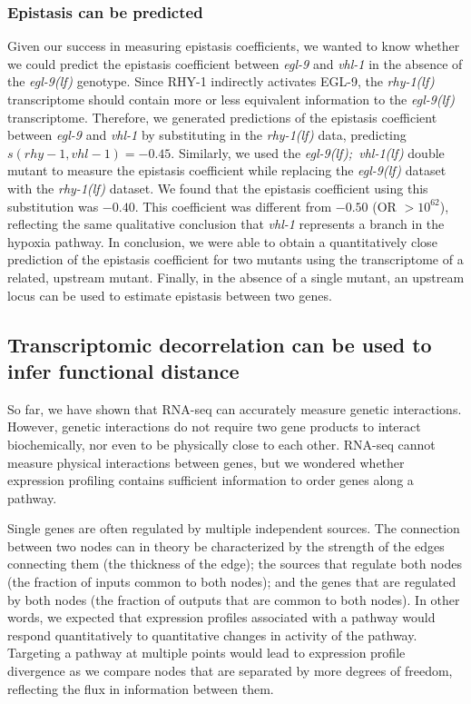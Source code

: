 \documentclass[9pt,twocolumn,twoside]{pnas-new}
\newcommand{\gene}[1]{\mbox{\emph{#1}}}
\newcommand{\egl}{\gene{egl-9(lf)}}
\newcommand{\rhy}{\gene{rhy-1(lf)}}
\newcommand{\eglvhl}{\gene{egl-9(lf); vhl-1(lf)}}
\newcommand{\eglp}{EGL-9}
\newcommand{\rhyp}{RHY-1}
\begin{document}
\subsubsection*{Epistasis can be predicted}
Given our success in measuring epistasis coefficients, we wanted to know whether
we could predict the epistasis coefficient between \gene{egl-9} and \gene{vhl-1}
in the absence of the \egl{} genotype. Since \rhyp{} indirectly activates
\eglp{}, the \rhy{} transcriptome should contain more or less equivalent
information to the \egl{} transcriptome. Therefore, we generated predictions of
the epistasis coefficient between \gene{egl-9} and \gene{vhl-1} by substituting
in the \rhy{} data, predicting $s({rhy-1,vhl-1}) = -0.45$. Similarly, we used
the \eglvhl{} double mutant to measure the epistasis coefficient while replacing
the \egl{} dataset with the \rhy{} dataset. We found that the epistasis
coefficient using this substitution was $-0.40$. This coefficient was different
from $-0.50$ (OR $>10^{62}$), reflecting the same qualitative conclusion that
\gene{vhl-1} represents a branch in the hypoxia pathway. In conclusion, we were
able to obtain a quantitatively close prediction of the epistasis coefficient
for two mutants using the transcriptome of a related, upstream mutant. Finally,
in the absence of a single mutant, an upstream locus can be used to estimate
epistasis between two genes.

\subsection*{Transcriptomic decorrelation can be used to infer functional distance}
\label{sub:decorrelation}
So far, we have shown that RNA-seq can accurately measure genetic interactions.
However, genetic interactions do not require two gene products to interact
biochemically, nor even to be physically close to each other. RNA-seq cannot
measure physical interactions between genes, but we wondered whether expression
profiling contains sufficient information to order genes along a pathway.

Single genes are often regulated by multiple independent sources. The connection
between two nodes can in theory be characterized by the strength of the edges
connecting them (the thickness of the edge); the sources that regulate both
nodes (the fraction of inputs common to both nodes); and the genes that are
regulated by both nodes (the fraction of outputs that are common to both nodes).
In other words, we expected that expression profiles associated with a pathway
would respond quantitatively to quantitative changes in activity of the pathway.
Targeting a pathway at multiple points would lead to expression profile
divergence as we compare nodes that are separated by more degrees of freedom,
reflecting the flux in information between them.
\end{document}
